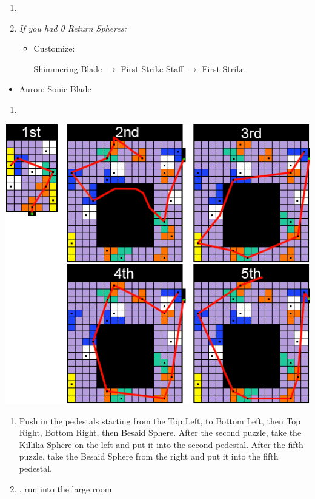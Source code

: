 \begin{enumerate}[resume]
  \item \formation{\tidus}{\auron}{\yuna}

  \item \textit{If you had 0 Return Spheres:}
        \begin{itemize}
          \item Customize:
                \begin{itemize}
                  \auronf Shimmering Blade $\rightarrow$ First Strike
                  \yunaf Staff $\rightarrow$ First Strike
                \end{itemize}
        \end{itemize}
        \end{enumerate}
        \begin{equip}
  \begin{itemize}
    \item Auron: Sonic Blade
  \end{itemize}
\end{equip}
\begin{enumerate}[resume]
  \item {\large \save}
\end{enumerate}
\includegraphics[width=.95\columnwidth]{graphics/Zanarkand_Trials}
\begin{enumerate}[resume]
  \item Push in the pedestals starting from the Top Left, to Bottom Left, then Top Right, Bottom Right, then Besaid Sphere. After the second puzzle, take the Killika Sphere on the left and put it into the second pedestal. After the fifth puzzle, take the Besaid Sphere from the right and put it into the fifth pedestal.
  \item \cs, run into the large room
\end{enumerate}
